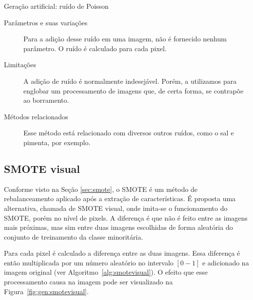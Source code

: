 \begin{algorithm}[!htbp]
  \caption{Geração artificial: ruído de Poisson}
  \label{alg:noise}
  \SetAlgoLined

\end{algorithm}

\begin{description}
  \item[Parâmetros e suas variações] Para a adição desse ruído em uma imagem, não é fornecido nenhum parâmetro. O ruído é calculado para cada pixel.
  \item[Limitações] A adição de ruído é normalmente indesejável. Porém, a utilizamos para englobar um processamento de imagens que, de certa forma, se contrapõe ao borramento.
  \item[Métodos relacionados] Esse método está relacionado com diversos outros ruídos, como o sal e pimenta, por exemplo.
\end{description}
\FloatBarrier
\subsection{SMOTE visual}

Conforme visto na Seção \ref{sec:smote}, o SMOTE é um método de rebalanceamento aplicado após a extração de características. É proposta uma alternativa, chamada de SMOTE visual, onde imita-se o funcionamento do SMOTE, porém no nível de pixels. A diferença é que não é feito entre as imagens mais próximas, mas sim entre duas imagens escolhidas de forma aleatória do conjunto de treinamento da classe minoritária.

Para cada pixel é calculado a diferença entre as duas imagens. Essa diferença é então multiplicada por um número aleatório no intervalo $[0-1]$ e adicionado
na imagem original (ver Algoritmo~\ref{alg:smotevisual}). O efeito que esse processamento causa na imagem pode ser visualizado na Figura~\ref{fig:gen:smotevisual}.

